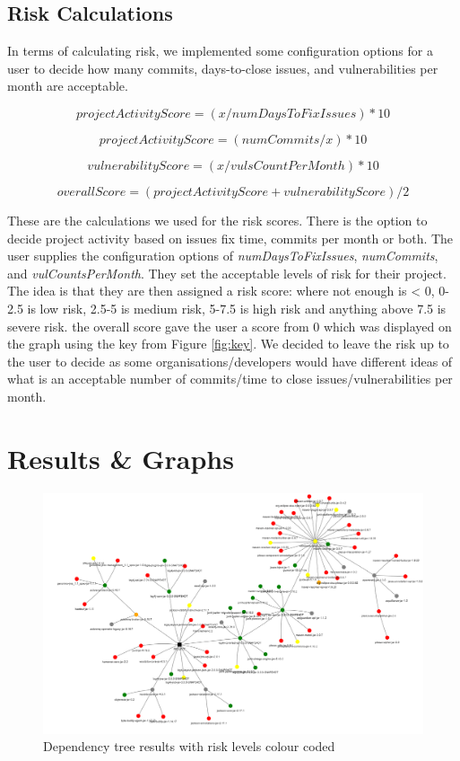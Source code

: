 \documentclass[10pt, compsoc, conference]{IEEEtran}
\begin{document}
\subsection{Risk Calculations}
In terms of calculating risk, we implemented some configuration options for a user to decide how many commits, days-to-close issues, and vulnerabilities per month are acceptable. 

\[ projectActivityScore = ( x / numDaysToFixIssues ) * 10\]

\[ projectActivityScore = ( numCommits / x ) * 10\]

\[vulnerabilityScore = ( x / vulsCountPerMonth ) * 10\]

\[overallScore = ( projectActivityScore + vulnerabilityScore) / 2\]

These are the calculations we used for the risk scores. There is the option to decide project activity based on issues fix time, commits per month or both. The user supplies the configuration options of \textit{numDaysToFixIssues}, \textit{numCommits}, and \textit{vulCountsPerMonth}. They set the acceptable levels of risk for their project. The idea is that they are then assigned a risk score: where not enough is < 0, 0-2.5 is low risk, 2.5-5 is medium risk, 5-7.5 is high risk and anything above 7.5 is severe risk. the overall score gave the user a score from 0 which was displayed on the graph using the key from Figure \ref{fig:key}. We decided to leave the risk up to the user to decide as some organisations/developers would have different ideas of what is an acceptable number of commits/time to close issues/vulnerabilities per month. 

\section{Results \& Graphs}

\begin{figure}
    \centering
    \includegraphics[width=1\linewidth]{image.png}
    \caption{Dependency tree results with risk levels colour coded} 
    \label{fig:tree}
\end{figure}
\end{document}
